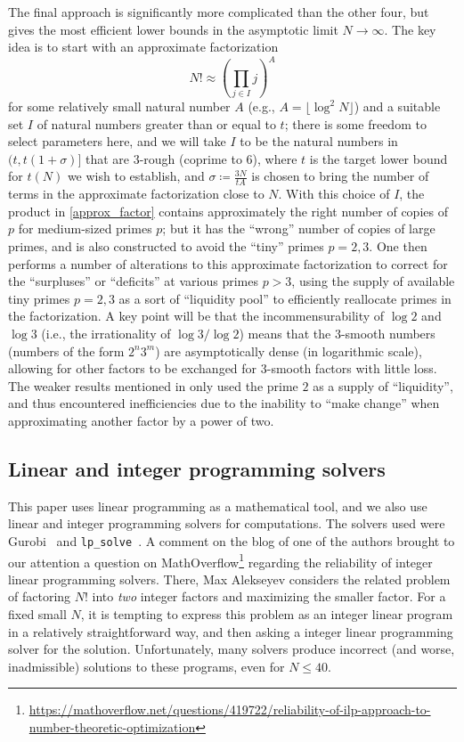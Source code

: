 \documentclass[10pt,a4paper,reqno]{amsart}
\numberwithin{equation}{section}
\theoremstyle{plain}
\theoremstyle{definition}
\begin{document}
The final approach is significantly more complicated than the other four, but gives the most efficient lower bounds in the asymptotic limit $N \to \infty$.  The key idea is to start with an approximate factorization
\begin{equation}\label{approx_factor}
   N! \approx \left(\prod_{j \in I} j\right)^A
\end{equation}
for some relatively small natural number $A$ (e.g., $A = \lfloor \log^2 N \rfloor$) and a suitable set $I$ of natural numbers greater than or equal to $t$; there is some freedom to select parameters here, and we will take $I$ to be the natural numbers in $(t, t(1+\sigma)]$ that are $3$-rough (coprime to $6$), where $t$ is the target lower bound for $t(N)$ we wish to establish, and $\sigma \coloneqq \frac{3N}{tA}$ is chosen to bring the number of terms in the approximate factorization close to $N$.  With this choice of $I$, the product in \eqref{approx_factor} contains approximately the right number of copies of $p$ for medium-sized primes $p$; but it has the ``wrong'' number of copies of large primes, and is also constructed to avoid the ``tiny'' primes $p=2,3$.  One then performs a number of alterations to this approximate factorization to correct for the ``surpluses'' or ``deficits'' at various primes $p>3$, using the supply of available tiny primes $p=2,3$ as a sort of ``liquidity pool'' to efficiently reallocate primes in the factorization.  A key point will be that the incommensurability of $\log 2$ and $\log 3$ (i.e., the irrationality of $\log 3/\log 2$) means that the $3$-smooth numbers (numbers of the form $2^n 3^m$) are asymptotically dense (in logarithmic scale), allowing for other factors to be exchanged for $3$-smooth factors with little loss.  The weaker results mentioned in   only used the prime $2$ as a supply of ``liquidity'', and thus encountered inefficiencies due to the inability to ``make change'' when approximating another factor by a power of two.

\subsection{Linear and integer programming solvers}

This paper uses linear programming as a mathematical tool, and we also use linear and integer programming solvers for computations.
The solvers used were Gurobi~\cite{gurobi} and \texttt{lp\_solve}~\cite{lpsolve}.
A comment on the blog of one of the authors brought to our attention a question on MathOverflow\footnote{\url{https://mathoverflow.net/questions/419722/reliability-of-ilp-approach-to-number-theoretic-optimization}} regarding the reliability of integer linear programming solvers.
There, Max Alekseyev considers the related problem of factoring $N!$ into \emph{two} integer factors and maximizing the smaller factor.
For a fixed small $N$, it is tempting to express this problem as an integer linear program in a relatively straightforward way, and then asking a integer linear programming solver for the solution.
Unfortunately, many solvers produce incorrect (and worse, inadmissible) solutions to these programs, even for $N\le 40$.
\end{document}
